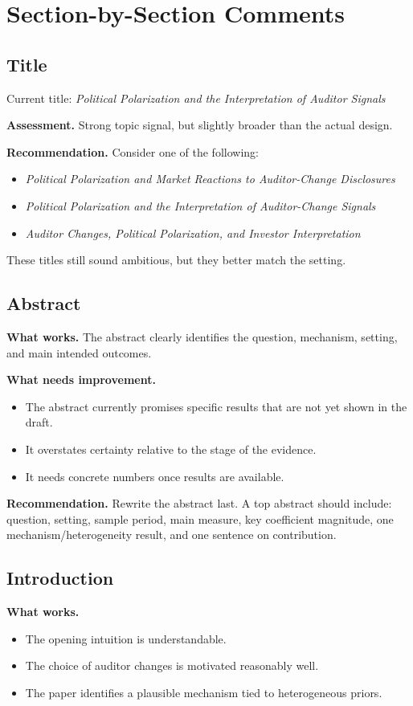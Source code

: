 \documentclass[12pt]{article}
\begin{document}
\section{Section-by-Section Comments}

\subsection{Title}
Current title: \textit{Political Polarization and the Interpretation of Auditor Signals}

\textbf{Assessment.} Strong topic signal, but slightly broader than the actual design.

\textbf{Recommendation.} Consider one of the following:
\begin{itemize}[leftmargin=2em]
    \item \textit{Political Polarization and Market Reactions to Auditor-Change Disclosures}
    \item \textit{Political Polarization and the Interpretation of Auditor-Change Signals}
    \item \textit{Auditor Changes, Political Polarization, and Investor Interpretation}
\end{itemize}
These titles still sound ambitious, but they better match the setting.

\subsection{Abstract}
\textbf{What works.} The abstract clearly identifies the question, mechanism, setting, and main intended outcomes.

\textbf{What needs improvement.}
\begin{itemize}[leftmargin=2em]
    \item The abstract currently promises specific results that are not yet shown in the draft.
    \item It overstates certainty relative to the stage of the evidence.
    \item It needs concrete numbers once results are available.
\end{itemize}

\textbf{Recommendation.} Rewrite the abstract last. A top abstract should include: question, setting, sample period, main measure, key coefficient magnitude, one mechanism/heterogeneity result, and one sentence on contribution.

\subsection{Introduction}
\textbf{What works.}
\begin{itemize}[leftmargin=2em]
    \item The opening intuition is understandable.
    \item The choice of auditor changes is motivated reasonably well.
    \item The paper identifies a plausible mechanism tied to heterogeneous priors.
\end{itemize}
\end{document}
